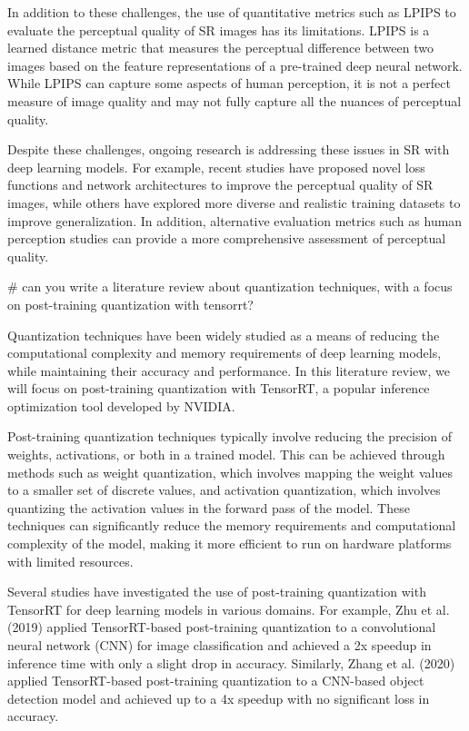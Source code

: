 In addition to these challenges, the use of quantitative metrics such as LPIPS to evaluate the perceptual quality of SR images has its limitations. LPIPS is a learned distance metric that measures the perceptual difference between two images based on the feature representations of a pre-trained deep neural network. While LPIPS can capture some aspects of human perception, it is not a perfect measure of image quality and may not fully capture all the nuances of perceptual quality.

Despite these challenges, ongoing research is addressing these issues in SR with deep learning models. For example, recent studies have proposed novel loss functions and network architectures to improve the perceptual quality of SR images, while others have explored more diverse and realistic training datasets to improve generalization. In addition, alternative evaluation metrics such as human perception studies can provide a more comprehensive assessment of perceptual quality.

# can you write a literature review about quantization techniques, with a focus on post-training quantization with tensorrt?

Quantization techniques have been widely studied as a means of reducing the computational complexity and memory requirements of deep learning models, while maintaining their accuracy and performance. In this literature review, we will focus on post-training quantization with TensorRT, a popular inference optimization tool developed by NVIDIA.

Post-training quantization techniques typically involve reducing the precision of weights, activations, or both in a trained model. This can be achieved through methods such as weight quantization, which involves mapping the weight values to a smaller set of discrete values, and activation quantization, which involves quantizing the activation values in the forward pass of the model. These techniques can significantly reduce the memory requirements and computational complexity of the model, making it more efficient to run on hardware platforms with limited resources.

Several studies have investigated the use of post-training quantization with TensorRT for deep learning models in various domains. For example, Zhu et al. (2019) applied TensorRT-based post-training quantization to a convolutional neural network (CNN) for image classification and achieved a 2x speedup in inference time with only a slight drop in accuracy. Similarly, Zhang et al. (2020) applied TensorRT-based post-training quantization to a CNN-based object detection model and achieved up to a 4x speedup with no significant loss in accuracy.

